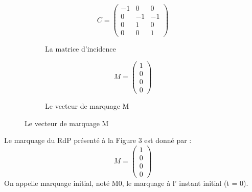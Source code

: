 \begin{exmp}
\begin{figure}[H]
		
		
		\begin{subfigure}[b]{0.4\textwidth}
			\[
			C=
			\begin{pmatrix}
			-1 & 0 & 0 \\
			0 & -1 & -1 \\
			0 & 1 & 0 \\
			0 & 0 & 1
			\end{pmatrix}
			\]
			\caption{La matrice d'incidence}
		\end{subfigure}
		\hfill
		\begin{subfigure}[b]{0.4\textwidth}
			\[	M=
			\begin{pmatrix}
			1  \\
			0  \\
			0  \\
			0 
			\end{pmatrix}
			\]
			\caption{Le vecteur de marquage M }
		\end{subfigure}
		
	\end{figure}
	
	Le marquage du RdP présenté à la Figure 3 est donné par : 
	\[	M=
	\begin{pmatrix}
	1  \\
	0  \\
	0  \\
	0 
	\end{pmatrix}
	\]
	On appelle marquage initial, noté M0, le marquage à l’ instant initial (t = 0). 
\end{exmp}


 


